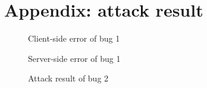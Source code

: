 \documentclass{llncs}
\begin{document}
\section{Appendix: attack result}

\begin{figure}
  \caption{Client-side error of bug 1}
  \label{fig:bug1c}
\end{figure}

\begin{figure}
  \caption{Server-side error of bug 1}
  \label{fig:bug1s}
\end{figure}

\begin{figure}
  \caption{Attack result of bug 2}
  \label{fig:bug1}
\end{figure}
\end{document}
